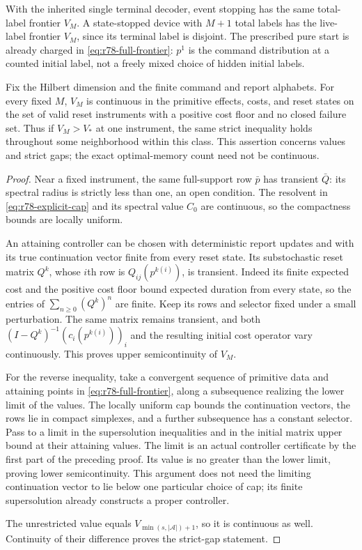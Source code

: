 With the inherited single terminal decoder, event stopping has the
same total-label frontier $V_M$.  A state-stopped device with $M+1$
total labels has the live-label frontier $V_M$, since its terminal
label is disjoint.  The prescribed pure start is already charged
in \eqref{eq:r78-full-frontier}: $p^1$ is the command distribution
at a counted initial label, not a freely mixed choice of hidden
initial labels.

\begin{proposition}
\label{prop:r78-frontier-stability}
Fix the Hilbert dimension and the finite command and report alphabets.
For every fixed $M$, $V_M$ is continuous in the primitive effects,
costs, and reset states on the set of valid reset instruments with a
positive cost floor and no closed failure set.  Thus if $V_M>V_*$ at
one instrument, the same strict inequality holds throughout some
neighborhood within this class.  This assertion concerns values and
strict gaps; the exact optimal-memory count need not be continuous.
\end{proposition}
\begin{proof}
Near a fixed instrument, the same full-support row $\bar p$ has
transient $\bar Q$: its spectral radius is strictly less than one,
an open condition.  The resolvent in
\eqref{eq:r78-explicit-cap} and its spectral value $C_0$ are
continuous, so the compactness bounds are locally uniform.

An attaining controller can be chosen with deterministic report
updates and with its true continuation vector finite from every
reset state.  Its substochastic reset matrix $Q^k$, whose $i$th
row is $Q_{ij}(p^{k(i)})$, is transient.  Indeed its finite expected
cost and the positive cost floor bound expected duration from every
state, so the entries of $\sum_{n\ge0}(Q^k)^n$ are finite.
Keep its rows and selector fixed under a small perturbation.  The
same matrix remains transient, and both
$(I-Q^k)^{-1}(c_i(p^{k(i)}))_i$ and the resulting initial cost
operator vary continuously.  This proves upper semicontinuity of
$V_M$.

For the reverse inequality, take a convergent sequence of primitive
data and attaining points in \eqref{eq:r78-full-frontier}, along
a subsequence realizing the lower limit of the values.  The locally
uniform cap bounds the continuation vectors, the rows lie in compact
simplexes, and a further subsequence has a constant selector.  Pass
to a limit in the supersolution inequalities and in the initial
matrix upper bound at their attaining values.  The limit is an
actual controller certificate by the first part of the preceding
proof.  Its value is no greater than the lower limit, proving lower
semicontinuity.  This argument does not need the limiting continuation
vector to lie below one particular choice of cap; its finite
supersolution already constructs a proper controller.

The unrestricted value equals $V_{\min(s,|\mathcal A|)+1}$, so it
is continuous as well.  Continuity of their difference proves the
strict-gap statement.
\end{proof}

